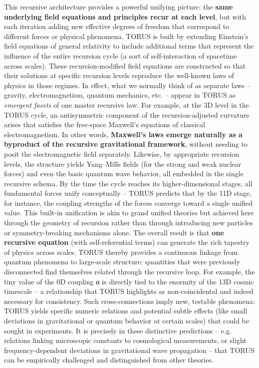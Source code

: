 This recursive architecture provides a powerful unifying picture: the
\textbf{same underlying field equations and principles recur at each
level}, but with each iteration adding new effective degrees of freedom
that correspond to different forces or physical phenomena. TORUS is
built by extending Einstein's field equations of general relativity to
include additional terms that represent the influence of the entire
recursion cycle (a sort of self-interaction of spacetime across
scales)​. These recursion-modified field equations are constructed so
that their solutions at specific recursion levels reproduce the
well-known laws of physics in those regimes. In effect, what we normally
think of as separate laws -- gravity, electromagnetism, quantum
mechanics, etc. -- appear in TORUS as \emph{emergent facets} of one
master recursive law. For example, at the 3D level in the TORUS cycle,
an antisymmetric component of the recursion-adjusted curvature arises
that satisfies the free-space Maxwell's equations of classical
electromagnetism​. In other words, \textbf{Maxwell's laws emerge
naturally as a byproduct of the recursive gravitational framework},
without needing to posit the electromagnetic field separately​.
Likewise, by appropriate recursion levels, the structure yields
Yang--Mills fields (for the strong and weak nuclear forces) and even the
basic quantum wave behavior, all embedded in the single recursive
schema. By the time the cycle reaches its higher-dimensional stages, all
fundamental forces unify conceptually -- TORUS predicts that by the 11D
stage, for instance, the coupling strengths of the forces converge
toward a single unified value​. This built-in unification is akin to
grand unified theories but achieved here through the geometry of
recursion rather than through introducing new particles or
symmetry-breaking mechanisms alone. The overall result is that
\textbf{one recursive equation} (with self-referential terms) can
generate the rich tapestry of physics across scales. TORUS thereby
provides a continuous linkage from quantum phenomena to large-scale
structure: quantities that were previously disconnected find themselves
related through the recursive loop. For example, the tiny value of the
0D coupling α is directly tied to the enormity of the 13D cosmic
timescale -- a relationship that TORUS highlights as non-coincidental
and indeed necessary for consistency​. Such cross-connections imply new,
testable phenomena: TORUS yields specific numeric relations and
potential subtle effects (like small deviations in gravitational or
quantum behavior at certain scales) that could be sought in
experiments​. It is precisely in these distinctive predictions -- e.g.
relations linking microscopic constants to cosmological measurements​,
or slight frequency-dependent deviations in gravitational wave
propagation -- that TORUS can be empirically challenged and
distinguished from other theories.

